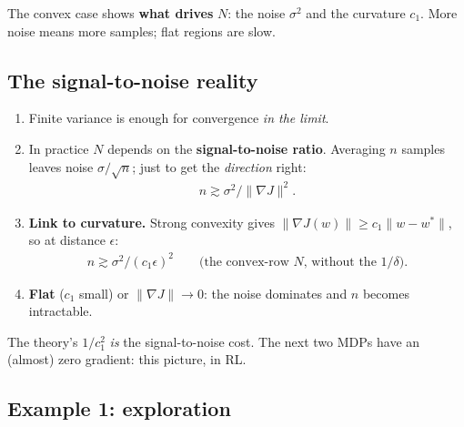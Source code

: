 \begin{keybox}[title={What carries over}]
The convex case shows \textbf{what drives} $N$: the noise $\sigma^2$ and the curvature $c_1$. More noise means more samples; flat regions are slow.
\end{keybox}

\subsection{The signal-to-noise reality}

\begin{enumerate}
  \item Finite variance is enough for convergence \emph{in the limit}.
  \item In practice $N$ depends on the \textbf{signal-to-noise ratio}. Averaging $n$ samples leaves noise $\sigma/\sqrt n$; just to get the \emph{direction} right:
  \begin{gather*}
    n \gtrsim \sigma^2/\|\nabla J\|^2.
  \end{gather*}
  \item \textbf{Link to curvature.} Strong convexity gives $\|\nabla J(w)\|\ge c_1\|w-w^*\|$, so at distance $\epsilon$:
  \begin{gather*}
    n \gtrsim \sigma^2/(c_1\epsilon)^2 \qquad \text{(the convex-row $N$, without the $1/\delta$)}.
  \end{gather*}
  \item \textbf{Flat} ($c_1$ small) or $\|\nabla J\|\to0$: the noise dominates and $n$ becomes intractable.
\end{enumerate}

\begin{notebox}
The theory's $1/c_1^2$ \emph{is} the signal-to-noise cost. The next two MDPs have an (almost) zero gradient: this picture, in RL.
\end{notebox}

\subsection{Example 1: exploration}
\label{sec:gap2-ex1}

\begin{center}
\end{center}

